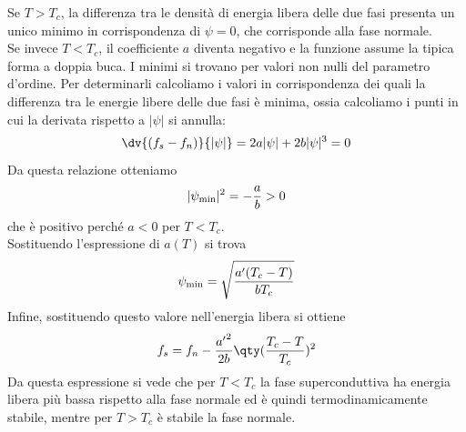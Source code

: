 \hspace{-0.6cm}Se $T>T_c$, la differenza tra le densità di energia libera delle due fasi presenta un unico minimo in corrispondenza di $\psi=0$, che corrisponde alla fase normale.\\
Se invece $T<T_c$, il coefficiente $a$ diventa negativo e la funzione assume la tipica forma a doppia buca. I minimi si trovano per valori non nulli del parametro d'ordine. Per determinarli calcoliamo i valori in corrispondenza dei quali la differenza tra le energie libere delle due fasi è minima, ossia calcoliamo i punti in cui la derivata rispetto a $|\psi|$ si annulla:
\begin{equation*}
   \dv{(f_s - f_n)}{|\psi|}
   =2a |\psi| + 2b |\psi|^3 =0
\end{equation*}
Da questa relazione otteniamo
\begin{equation*}
   |\psi_{\rm min}|^2 = -\frac{a}{b} > 0
\end{equation*}
che è positivo perché $a<0$ per $T<T_c$.\\
Sostituendo l'espressione di $a(T)$ si trova
\begin{equation*}
   \psi_{\rm min}
   =\sqrt{\frac{a'(T_c-T)}{b T_c}}
\end{equation*}
Infine, sostituendo questo valore nell'energia libera si ottiene
\begin{equation*}
   f_s
   = f_n - \frac{{a'}^2}{2b} \qty(\frac{T_c-T}{T_c})^2
\end{equation*}
Da questa espressione si vede che per $T<T_c$ la fase superconduttiva ha energia libera più bassa rispetto alla fase normale ed è quindi termodinamicamente stabile, mentre per $T>T_c$ è stabile la fase normale.
